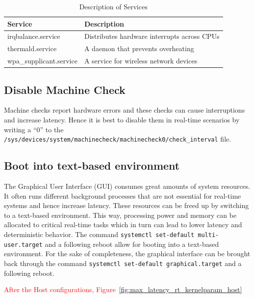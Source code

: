 \documentclass[MMR,Master,english]{twbook}
\begin{document}
\begin{table}[H]
	\centering
	\caption{Description of Services}
	\label{tab:stop_servies}
	\setlength{\tabcolsep}{0.5em} %
	{\renewcommand{\arraystretch}{1.2}%
		\begin{tabular}{|l|l|}
			\hline
			\textbf{Service}        & \textbf{Description}                        \\
			\hline
			irqbalance.service      & Distributes hardware interrupts across CPUs \\\hline
			thermald.service        & A daemon that prevents overheating          \\\hline
			wpa\_supplicant.service & A service for wireless network devices      \\
			\hline
		\end{tabular}}
\end{table}
\subsection{Disable Machine Check}
Machine checks report hardware errors and these checks can cause interruptions and increase latency. Hence it is best to disable them in real-time scenarios by writing a ``0'' to the \texttt{/sys/devices/system/machinecheck/machinecheck0/check\_interval} file.

\subsection{Boot into text-based environment}
The Graphical User Interface (GUI) consumes great amounts of system resources. It often runs different background processes that are not essential for real-time systems and hence increase latency. These resources can be freed up by switching to a text-based environment. This way, processing power and memory can be allocated to critical real-time tasks which in turn can lead to lower latency and deterministic behavior. The command \texttt{systemctl set-default multi-user.target} and a following reboot allow for booting into a text-based environment. For the sake of completeness, the graphical interface can be brought back through the command \texttt{systemctl set-default graphical.target} and a following reboot.

\textcolor{red}{After the Host configurations, Figure~\ref{fig:max_latency_rt_kernelparam_host}}
\end{document}
